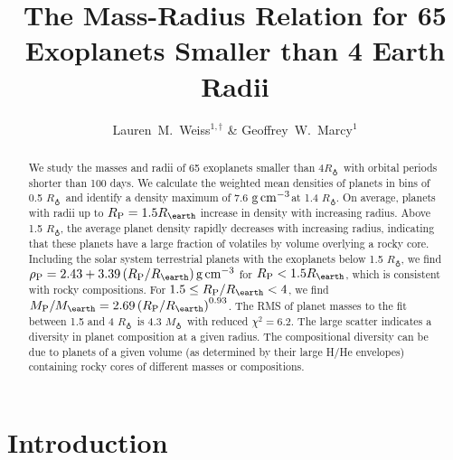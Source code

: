 \documentclass[iop]{emulateapj}
\newcommand{\gcmc}{\ensuremath{\rm g\,cm^{-3}}}
\newcommand{\gcc}{\gcmc}
\newcommand{\rpl}{\ensuremath{R_{\rm P}}}
\newcommand{\mpl}{\ensuremath{M_{\rm P}}}
\newcommand{\rhopl}{\ensuremath{\rho_{\rm P}}}
\newcommand{\rearth}{\ensuremath{R_\earth}}
\newcommand{\mearth}{\ensuremath{M_\earth}}
\begin{document}
\title{The Mass-Radius Relation for 65 Exoplanets Smaller than 4 Earth Radii}
\author{Lauren~M.~Weiss$^{1,\dagger}$ \& Geoffrey~W.~Marcy$^1$}


\begin{abstract}
We study the masses and radii of 65 exoplanets smaller than 4\rearth\ with orbital periods shorter than 100 days.  We calculate the weighted mean densities of planets in bins of 0.5 \rearth\ and identify a density maximum of 7.6 \gcc at 1.4 \rearth.  On average, planets with radii up to $\rpl=1.5\rearth$ increase in density with increasing radius.   Above 1.5 \rearth, the average planet density rapidly decreases with increasing radius, indicating that these planets have a large fraction of volatiles by volume overlying a rocky core.  Including the solar system terrestrial planets with the exoplanets below 1.5 \rearth, we find $\rhopl = 2.43 + 3.39 \left(\rpl/\rearth\right) \gcc$ for $\rpl < 1.5 \rearth$, which is consistent with rocky compositions.  For $1.5 \le \rpl/\rearth < 4$, we find $\mpl/\mearth = 2.69 \left(\rpl/\rearth\right)^{0.93}$.  The RMS of planet masses to the fit between 1.5 and 4 \rearth\ is 4.3 \mearth\ with reduced $\chi^2=6.2$.  The large scatter indicates a diversity in planet composition at a given radius.  The compositional diversity can be due to planets of a given volume (as determined by their large H/He envelopes) containing rocky cores of different masses or compositions.
\end{abstract}


\section{Introduction}
\end{document}
